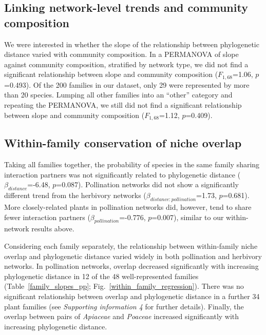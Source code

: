 \documentclass[12pt]{article}
\begin{document}
\begin{spacing}{1.5}
  \subsection*{Linking network-level trends and community composition} 

    We were interested in whether the slope of the relationship between phylogenetic distance varied with community composition. In a PERMANOVA of slope against community composition, stratified by network type, we did not find a significant relationship between slope and community composition ($F_{1,68}$=1.06, $p$=0.493). Of the 200 families in our dataset, only 29 were represented by more than 20 species. Lumping all other families into an ``other'' category and repeating the PERMANOVA, we still did not find a significant relationship between slope and community composition ($F_{1,68}$=1.12, $p$=0.409). 


  \subsection*{Within-family conservation of niche overlap} 

    Taking all families together, the probability of species in the same family sharing interaction partners was not significantly related to phylogenetic distance ($\beta_{distance}$=-6.48, $p$=0.087). Pollination networks did not show a significantly different trend from the herbivory networks ($\beta_{distance:pollination}$=1.73, $p$=0.681). More closely-related plants in pollination networks did, however, tend to share fewer interaction partners ($\beta_{pollination}$=-0.776, $p$=0.007), similar to our within-network results above.


    Considering each family separately, the relationship between within-family niche overlap and phylogenetic distance varied widely in both pollination and herbivory networks. 
    In pollination networks, overlap decreased significantly with increasing phylogenetic distance in 12 of the 48 well-represented families (Table~\ref{family_slopes_pp}; Fig.~\ref{within_family_regression}).
    There was no significant relationship between overlap and phylogenetic distance in
    a further 34 plant families (see \emph{Supporting information 4} for further 
    details). Finally, the overlap between pairs of \emph{Apiaceae} and \emph{Poaceae} increased significantly with increasing phylogenetic distance.



\end{spacing}
\end{document}
